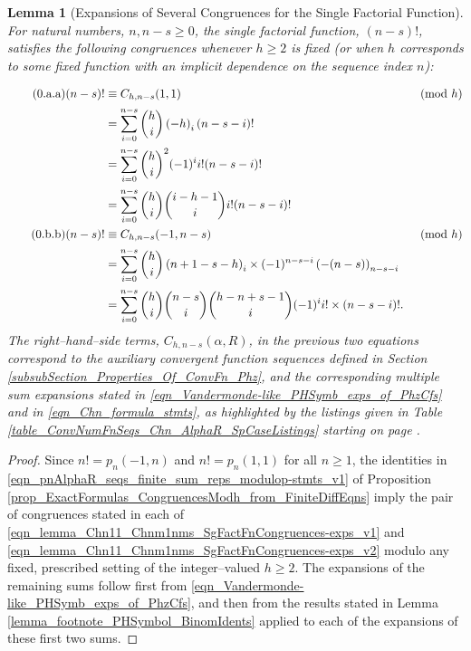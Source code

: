 \documentclass[12pt,reqno]{article}
\renewenvironment{subequations}{%
  \refstepcounter{equation}%
  \edef\theparentequation{\theequation}%
  \setcounter{parentequation}{\value{equation}}%
  \setcounter{equation}{0}%
  \def\theequation{\theparentequation.\alph{equation}}%
  \ignorespaces
}{%
  \setcounter{equation}{\value{parentequation}}%
  \ignorespacesafterend
}
\numberwithin{sfootnote}{section}
\newcommand{\tablerefIII}[2]{Table \ref{#1} starting on page \pageref{#2}}
\numberwithin{equation}{section}
\newcommand{\tagonce}[0]{
     \addtocounter{equation}{1}
     \tag{\theequation}
}
\theoremstyle{DefaultTheoremStyle}
\newtheorem{lemma}[theorem]{Lemma}
\theoremstyle{definition}
\newcommand{\StartGroupingSubEquations}{\begin{subequations}}
\newcommand{\EndGroupingSubEquations}{\end{subequations}}
\newcommand{\Pochhammer}[2]{\ensuremath{\left(#1\right)_{#2}}}
\newcommand{\pn}[3]{\ensuremath{p_{#1}\left(#2, #3\right)}}
\begin{document}
\begin{lemma}[Expansions of Several Congruences for the Single Factorial Function] 
\label{lemma_} 
For natural numbers, $n,n-s \geq 0$, the single factorial function, $(n-s)!$, 
satisfies the following congruences 
whenever $h \geq 2$ is fixed (or when $h$ 
corresponds to some fixed function with an implicit dependence on the 
sequence index $n$): 
\StartGroupingSubEquations 
\label{eqn_lemma_Chn11_Chnm1nms_SgFactFnCongruences-exps_subeqns_ref} 
\begin{align*} 
\tagonce\label{eqn_lemma_Chn11_Chnm1nms_SgFactFnCongruences-exps_v1} 
(n-s)! 
     & \equiv 
     C_{h,n-s}(1, 1) && \pmod{h} \\ 
     & = 
     \sum_{i=0}^{n-s} \binom{h}{i} \Pochhammer{-h}{i} (n-s-i)! && \\ 
     & = 
     \sum_{i=0}^{n-s} \binom{h}{i}^{2} (-1)^{i} i! (n-s-i)! && \\ 
     & = 
     \sum_{i=0}^{n-s} \binom{h}{i} \binom{i-h-1}{i} i! (n-s-i)! && \\ 
\tagonce\label{eqn_lemma_Chn11_Chnm1nms_SgFactFnCongruences-exps_v2}  
(n-s)! 
     & \equiv 
     C_{h,n-s}(-1, n-s) && \pmod{h} \\ 
     & = 
     \sum_{i=0}^{n-s} \binom{h}{i} 
     \Pochhammer{n+1-s-h}{i} \times 
     (-1)^{n-s-i} \Pochhammer{-(n-s)}{n-s-i} && \\ 
     & = 
     \sum_{i=0}^{n-s} \binom{h}{i} \binom{n-s}{i} \binom{h-n+s-1}{i} 
     (-1)^{i} i! \times (n-s-i)!. && 
\end{align*} 
\EndGroupingSubEquations 
The right--hand--side terms, $C_{h,n-s}(\alpha, R)$, in the 
previous two equations correspond to the auxiliary convergent function 
sequences defined in 
Section \ref{subsubSection_Properties_Of_ConvFn_Phz}, and the 
corresponding multiple sum expansions stated in 
\eqref{eqn_Vandermonde-like_PHSymb_exps_of_PhzCfs} and in 
\eqref{eqn_Chn_formula_stmts}, 
as highlighted by the listings given in 
\tablerefIII{table_ConvNumFnSeqs_Chn_AlphaR_SpCaseListings}{table_ConvNumFnSeqs_Chn_AlphaR_SpCaseListings-first_subtable_pageref}. 
\end{lemma} 
\begin{proof} 
Since $n! = \pn{n}{-1}{n}$ and $n! = \pn{n}{1}{1}$ for all $n \geq 1$, the 
identities in \eqref{eqn_pnAlphaR_seqs_finite_sum_reps_modulop-stmts_v1} of 
Proposition \ref{prop_ExactFormulas_CongruencesModh_from_FiniteDiffEqns} 
imply the pair of congruences stated in each of 
\eqref{eqn_lemma_Chn11_Chnm1nms_SgFactFnCongruences-exps_v1} and 
\eqref{eqn_lemma_Chn11_Chnm1nms_SgFactFnCongruences-exps_v2} 
modulo any fixed, prescribed setting of the integer--valued $h \geq 2$. 
The expansions of the remaining sums follow first from 
\eqref{eqn_Vandermonde-like_PHSymb_exps_of_PhzCfs}, and then from the 
results stated in 
Lemma \ref{lemma_footnote_PHSymbol_BinomIdents} 
applied to each of the expansions of these first two sums. 
\end{proof} 
\end{document}
